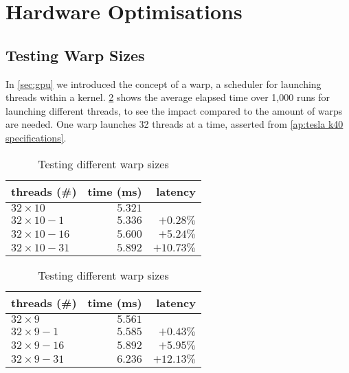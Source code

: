 \section{Hardware Optimisations}
\label{sec:hardware optimisations}

\subsection{Testing Warp Sizes}
\label{sec:testing warp sizes}

In \cref{sec:gpu} we introduced the concept of a warp, a scheduler for launching threads within a kernel.
\cref{tab:warp size testing} shows the average elapsed time over 1,000 runs for launching different threads, to see the impact compared to the amount of warps are needed.
One warp launches 32 threads at a time, asserted from \cref{ap:tesla k40 specifications}.

\begin{table}[htb]%
  \begin{minipage}{0.49\linewidth}
    \centering
    \begin{tabular}{lrr}
      \toprule
      threads (\#) & time (ms) & latency \\
      \midrule
      $32 \times 10$    & $5.321$ &          \\
      $32 \times 10-1$  & $5.336$ & $+0.28\%$  \\
      $32 \times 10-16$ & $5.600$ & $+5.24\%$  \\
      $32 \times 10-31$ & $5.892$ & $+10.73\%$ \\
      \bottomrule
    \end{tabular}
  \end{minipage}%
  \begin{minipage}{0.49\linewidth}
    \centering
    \begin{tabular}{lrr}
      \toprule
      threads (\#) & time (ms) & latency \\
      \midrule
      $32 \times 9$     & $5.561$ & \\
      $32 \times 9-1$   & $5.585$ & $+0.43\%$  \\
      $32 \times 9-16$  & $5.892$ & $+5.95\%$  \\
      $32 \times 9-31$  & $6.236$ & $+12.13\%$ \\
      \bottomrule
    \end{tabular}
  \end{minipage}%
  \caption{Testing different warp sizes}
  \label{tab:warp size testing}
\end{table}

